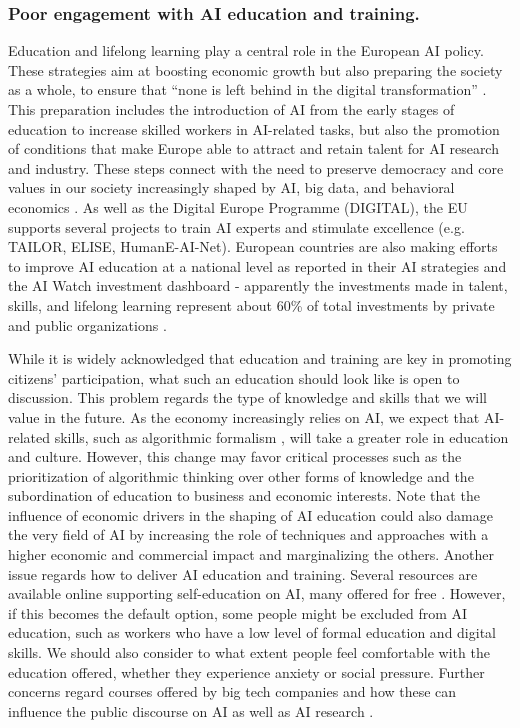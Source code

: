 \documentclass{article}
\begin{document}
 \subsubsection{\textbf{Poor engagement with AI education and training}.}
Education and lifelong learning play a central role in the European AI policy. These strategies aim at boosting economic growth but also preparing the society as a whole, to ensure that ``none is left behind in the digital transformation'' \cite{ai_agenda}. This preparation includes the introduction of AI from the early stages of education to increase skilled workers in AI-related tasks, but also the promotion of conditions that make Europe able to attract and retain talent for AI research and industry. These steps connect with the need to preserve democracy and core values in our society increasingly shaped by AI, big data, and behavioral economics \cite{helbing2019will, cristianini2020social}. 
As well as the Digital Europe Programme (DIGITAL), the EU supports several projects to train AI experts and stimulate excellence (e.g. TAILOR, ELISE, HumanE-AI-Net). European countries are also making efforts to improve AI education at a national level as reported in their AI strategies \cite{Foffano22} and the AI Watch investment dashboard - apparently the investments made in talent, skills, and lifelong learning represent about 60\% of total investments by private and public organizations \cite{AIwatch}.

While it is widely acknowledged that education and training are key in promoting citizens' participation, what such an education should look like is open to discussion. This problem regards the type of knowledge and skills that we will value in the future. As the economy increasingly relies on AI, we expect that AI-related skills, such as algorithmic formalism  \cite{green2020algorithmic}, will take a greater role in education and culture. However, this change may favor critical processes such as the prioritization of algorithmic thinking over other forms of knowledge \cite{boyd2012critical} and the subordination of education to business and economic interests. Note that the influence of economic drivers in the shaping of AI education could also damage the very field of AI by increasing the role of techniques and approaches with a higher economic and commercial impact and marginalizing the others.
Another issue regards how to deliver AI education and training. Several resources are available online supporting self-education on AI, many offered for free \cite{elemAI}. However, if this becomes the default option, some people might be excluded from AI education, such as workers who have a low level of formal education and digital skills. We should also consider to what extent people feel comfortable with the education offered, whether they experience anxiety or social pressure. Further concerns regard courses offered by big tech companies and how these can influence the public discourse on AI as well as AI research \cite{luchs2023learning}.
\end{document}
